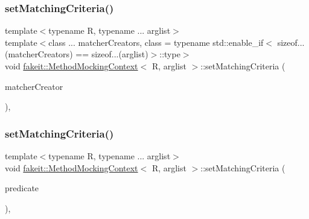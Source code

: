 \mbox{\label{classfakeit_1_1MethodMockingContext_ab6bf85e9f9f5e5eeb2766ec487a42e20}} 
\subsubsection{\texorpdfstring{setMatchingCriteria()}{setMatchingCriteria()}\hspace{0.1cm}{\footnotesize\ttfamily [21/27]}}
{\footnotesize\ttfamily template$<$typename R, typename ... arglist$>$ \\
template$<$class ... matcher\+Creators, class  = typename std\+::enable\+\_\+if$<$                sizeof...(matcher\+Creators) == sizeof...(arglist)$>$\+::type$>$ \\
void \mbox{\hyperlink{classfakeit_1_1MethodMockingContext}{fakeit\+::\+Method\+Mocking\+Context}}$<$ R, arglist $>$\+::set\+Matching\+Criteria (\begin{DoxyParamCaption}\item[{const matcher\+Creators \&...}]{matcher\+Creator }\end{DoxyParamCaption})\hspace{0.3cm}{\ttfamily [inline]}, {\ttfamily [protected]}}

\mbox{\label{classfakeit_1_1MethodMockingContext_a43555a14b32453588eb3990a7c6b9a09}} 
\subsubsection{\texorpdfstring{setMatchingCriteria()}{setMatchingCriteria()}\hspace{0.1cm}{\footnotesize\ttfamily [22/27]}}
{\footnotesize\ttfamily template$<$typename R, typename ... arglist$>$ \\
void \mbox{\hyperlink{classfakeit_1_1MethodMockingContext}{fakeit\+::\+Method\+Mocking\+Context}}$<$ R, arglist $>$\+::set\+Matching\+Criteria (\begin{DoxyParamCaption}\item[{std\+::function$<$ bool(arglist \&...)$>$}]{predicate }\end{DoxyParamCaption})\hspace{0.3cm}{\ttfamily [inline]}, {\ttfamily [protected]}}

